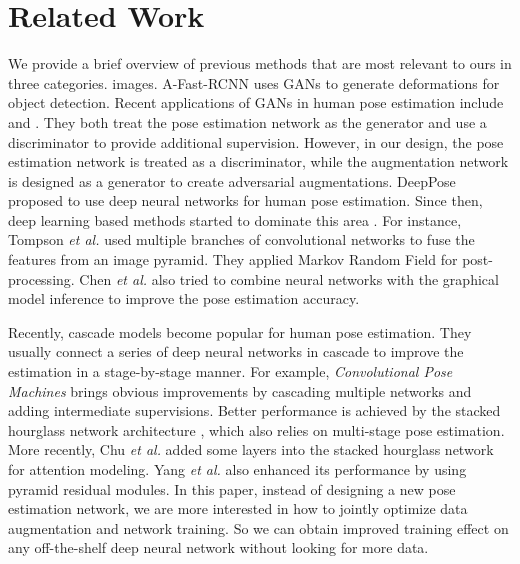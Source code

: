\documentclass[10pt,twocolumn,letterpaper]{article}
\begin{document}
\section{Related Work}

We provide a brief overview of previous methods that are most relevant to ours in three categories.%
images. A-Fast-RCNN \cite{wang2017fast} uses GANs to generate deformations for object detection. Recent applications of GANs in human pose estimation include \cite{yu2017adversarial} and \cite{chou2017self}. They both treat the pose estimation network as the generator and use a discriminator to provide additional supervision. However, in our design, the pose estimation network is treated as a discriminator, while the augmentation network is designed as a generator to create adversarial augmentations.
DeepPose \cite{toshev2014deeppose} proposed to use deep neural networks for human pose estimation. Since then, deep learning based methods started to dominate this area \cite{carreira2016human, tompson2015efficient, hu2016bottom, pishchulin2016deepcut, lifshitz2016human, gkioxari2016chained, insafutdinov2016deepercut, wei2016convolutional, bulat2016human, newell2016stacked}.
For instance, Tompson {\it et al.}\cite{tompson2014joint} used multiple branches of convolutional networks to fuse the features from an image pyramid. They applied Markov Random Field for post-processing. Chen {\it et al.}\cite{chen2014articulated} also tried to combine neural networks with the graphical model inference to improve the pose estimation accuracy. 

Recently, cascade models become popular for human pose estimation. They usually connect a series of deep neural networks in cascade to improve the estimation in a stage-by-stage manner. For example, {\em Convolutional Pose Machines}\cite{wei2016convolutional} brings obvious improvements by cascading multiple networks and adding intermediate supervisions. Better performance is achieved by the stacked hourglass network architecture \cite{newell2016stacked}, which also relies on multi-stage pose estimation. More recently, Chu {\it et al.}\cite{chu2017multi} added some layers into the stacked hourglass network for attention modeling. Yang {\it et al.}\cite{yang2017learning} also enhanced its performance by using pyramid residual modules. In this paper, instead of designing a new pose estimation network, we are more interested in how to jointly optimize data augmentation and network training. So we can obtain improved training effect on any off-the-shelf deep neural network without looking for more data.
\end{document}
